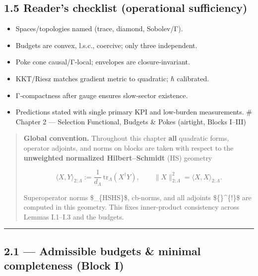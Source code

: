 \documentclass[
]{article}
\providecommand{\tightlist}{%
  \setlength{\itemsep}{0pt}\setlength{\parskip}{0pt}}
\numberwithin{equation}{section}
\begin{document}
\hypertarget{readers-checklist-operational-sufficiency}{%
\subsection{1.5 Reader's checklist (operational
sufficiency)}\label{readers-checklist-operational-sufficiency}}

\begin{itemize}
\tightlist
\item
  Spaces/topologies named (trace, diamond, Sobolev/Γ).
\item
  Budgets are convex, l.s.c., coercive; only three independent.
\item
  Poke cone causal/Γ‑local; envelopes are closure‑invariant.
\item
  KKT/Riesz matches gradient metric to quadratic; \(\hbar\) calibrated.
\item
  Γ‑compactness after gauge ensures slow‑sector existence.
\item
  Predictions stated with single primary KPI and low‑burden
  measurements. \# Chapter 2 --- Selection Functional, Budgets \& Pokes
  (airtight, Blocks I--III)
\end{itemize}

\begin{quote}
\textbf{Global convention.} Throughout this chapter \textbf{all}
quadratic forms, operator adjoints, and norms on blocks are taken with
respect to the \textbf{unweighted normalized Hilbert--Schmidt} (HS)
geometry

\[
\langle X,Y\rangle_{2;\Lambda}:=\frac{1}{d_\Lambda}\,\mathrm{tr}_\Lambda(X^\dagger Y),\qquad 
\|X\|_{2;\Lambda}^2=\langle X,X\rangle_{2;\Lambda}.
\]

Superoperator norms \$\textbar{}\cdot\textbar\_\{HS\to HS\}\$, cb-norms,
and all adjoints \$\{\}\^{}\{!\}\$ are computed in this geometry. This
fixes inner-product consistency across Lemmas I.1--I.3 and the budgets.
\end{quote}

\begin{center}\rule{0.5\linewidth}{0.5pt}\end{center}

\hypertarget{admissible-budgets-minimal-completeness-block-i}{%
\subsection{2.1 --- Admissible budgets \& minimal completeness (Block
I)}\label{admissible-budgets-minimal-completeness-block-i}}
\end{document}

